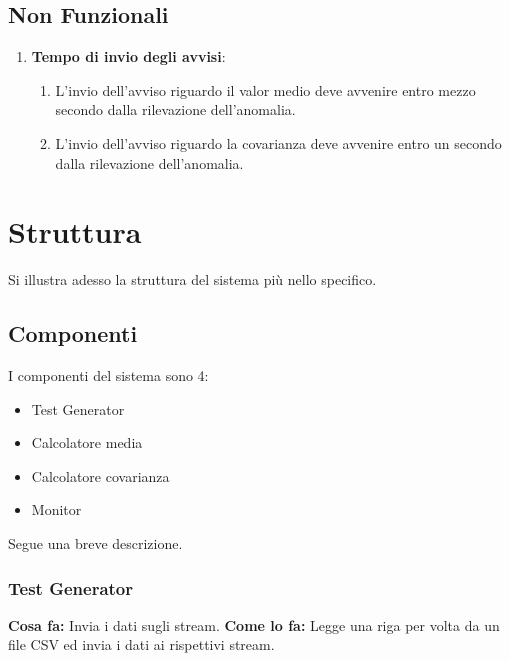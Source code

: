 \documentclass{article}
\begin{document}
\subsection{Non Funzionali}

\begin{enumerate}
	\item \textbf{Tempo di invio degli avvisi}:
	      \begin{enumerate}[label*=\arabic*.]
	      	\item L'invio dell'avviso riguardo il valor medio deve avvenire entro mezzo secondo dalla rilevazione dell'anomalia.
	      	      
	      	\item L'invio dell'avviso riguardo la covarianza deve avvenire entro un secondo dalla rilevazione dell'anomalia.
	      \end{enumerate}
	          
\end{enumerate}

\newpage

\section{Struttura}

Si illustra adesso la struttura del sistema più nello specifico.

\subsection{Componenti}

I componenti del sistema sono 4:
\begin{itemize}
	\item Test Generator
	\item Calcolatore media
	\item Calcolatore covarianza
	\item Monitor
\end{itemize}

Segue una breve descrizione.

\subsubsection{Test Generator}
\textbf{Cosa fa:} Invia i dati sugli stream.
\vspace{3pt}
\newline
\textbf{Come lo fa:} Legge una riga per volta da un file CSV ed invia i dati ai rispettivi stream.
\end{document}
